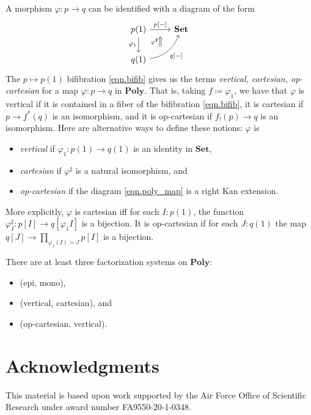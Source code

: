 \documentclass[11pt, one side, article]{memoir}
\theoremstyle{definition}
\theoremstyle{plain}
\newcommand{\Cat}[1]{\mathbf{#1}}%
\newcommand{\smset}{\Cat{Set}}
\newcommand{\poly}{\Cat{Poly}}
\newcommand{\0}{\textsf{0}}
\newcommand{\1}{\tn{\textsf{1}}}
\begin{document}
A morphism $\varphi\colon p\to q$ can be identified with a diagram of the form
\begin{equation}\label{eqn.poly_map}
\begin{tikzcd}
	p(1)\ar[d, "\varphi_1"']\ar[r, "{p[-]}", ""' name=p]&
	\smset\\
	q(1)\ar[ur, bend right, "{q[-]}"', "" name=q]
	\ar[to=p, from=q-|p, Rightarrow, shorten=3pt, "\varphi^\sharp"]
\end{tikzcd}
\end{equation}
The $p\mapsto p(1)$ bifibration \eqref{eqn.bifib} gives us the terms \emph{vertical, cartesian,  op-cartesian} for a map $\varphi\colon p\to q$ in $\poly$. That is, taking $f\coloneqq\varphi_1$, we have that $\varphi$ is vertical if it is contained in a fiber of the bifibration \eqref{eqn.bifib}, it is cartesian if $p\to f^*(q)$ is an isomorphism, and it is op-cartesian if $f_!(p)\to q$ is an isomorphism. Here are alternative ways to define these notions: $\varphi$ is 
\begin{itemize}
	\item \emph{vertical} if $\varphi_1\colon p(1)\to q(1)$ is an identity in $\smset$,
	\item \emph{cartesian} if $\varphi^\sharp$ is a natural isomorphism, and
	\item \emph{op-cartesian} if the diagram \eqref{eqn.poly_map} is a right Kan extension.
\end{itemize}
More explicitly, $\varphi$ is cartesian iff for each $I: p(1)$, the function $\varphi^\sharp_I\colon p[I]\to q[\varphi_1I]$ is a bijection. It is op-cartesian if for each $J: q(1)$ the map $q[J]\to\prod\limits_{\varphi_1(I)=J}p[I]$ is a bijection.

There are at least three factorization systems on $\poly$:
\begin{itemize}
	\item (epi, mono),
	\item (vertical, cartesian), and
	\item (op-cartesian, vertical).
\end{itemize}


\section*{Acknowledgments}
This material is based upon work supported by the Air Force Office of Scientific Research under award number FA9550-20-1-0348.

\printbibliography 
\end{document}

